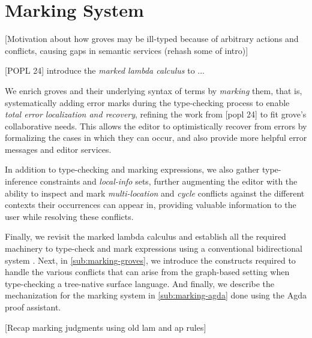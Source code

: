 
\section{Marking System}%
\label{sec:Marking System}

[Motivation about how groves may be ill-typed because of arbitrary actions and conflicts, causing gaps in semantic services (rehash some of intro)]

[POPL 24] introduce the \emph{marked lambda calculus} to ...

We enrich groves and their underlying syntax of terms by \emph{marking} them, that is, systematically adding error marks during the type-checking process to enable \emph{total error localization and recovery}, refining the work from [popl 24] to fit grove's collaborative needs. This allows the editor to optimistically recover from errors by formalizing the cases in which they can occur, and also provide more helpful error messages and editor services.

In addition to type-checking and marking expressions, we also gather type-inference constraints and \emph{local-info} sets, further augmenting the editor with the ability to inspect and mark \emph{multi-location} and \emph{cycle} conflicts against the different contexts their occurrences can appear in, providing valuable information to the user while resolving these conflicts.

Finally, we revisit the marked lambda calculus and establish all the required machinery to type-check and mark expressions using a conventional bidirectional system . Next, in \autoref{sub:marking-groves}, we introduce the constructs required to handle the various conflicts that can arise from the graph-based setting when type-checking a tree-native surface language. And finally, we describe the mechanization for the marking system in \autoref{sub:marking-agda} done using the Agda  proof assistant.

[Recap marking judgments using old lam and ap rules]


